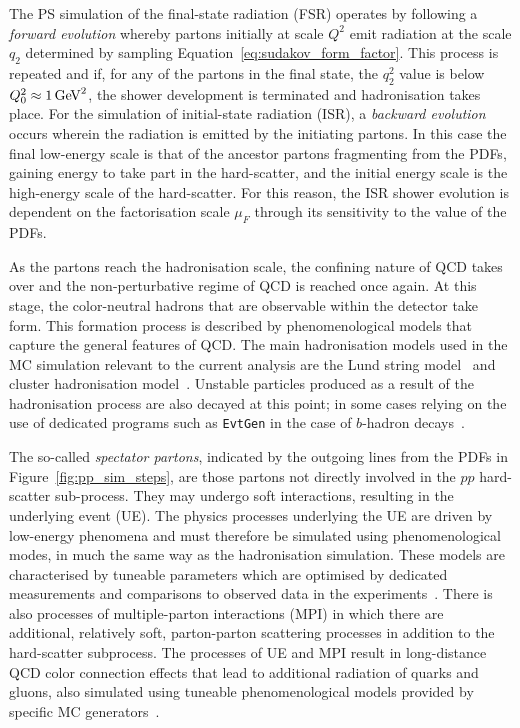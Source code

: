 The PS simulation of the final-state radiation (FSR) operates by following a \textit{forward evolution} whereby partons initially at scale $Q^2$
emit radiation at the scale $q_2$ determined by sampling Equation~\ref{eq:sudakov_form_factor}. This process is repeated and if,
for any of the partons in the final state, the $q_2^2$ value is below $Q_0^2 \approx 1\,\text{Ge\kern -0.1em V}^2$, the shower development is terminated
and hadronisation takes place.
For the simulation of initial-state radiation (ISR), a \textit{backward evolution} occurs wherein the radiation is emitted
by the initiating partons. In this case the final low-energy scale is that of the ancestor partons fragmenting from the PDFs, gaining energy to take part
in the hard-scatter, and the initial energy scale is the high-energy scale of the hard-scatter.
For this reason, the ISR shower evolution is dependent on the factorisation scale $\mu_F$ through
its sensitivity to the value of the PDFs.

As the partons reach the hadronisation scale, the confining nature of QCD takes over and the non-perturbative regime of QCD is reached
once again.
At this stage, the color-neutral hadrons that are observable within the detector take form.
This formation process is described by phenomenological models that capture the general
features of QCD.
The main hadronisation models used in the MC simulation relevant to the current analysis are the
Lund string model~\cite{Andersson:1983ia} and cluster hadronisation model~\cite{Webber:1983if}.
Unstable particles produced as a result of the hadronisation process are also decayed at this point;
in some cases relying on the use of dedicated programs such as \texttt{EvtGen} in the case of $b$-hadron decays~\cite{Lange:2001uf}.

The so-called \textit{spectator partons}, indicated by the outgoing lines from the PDFs in Figure~\ref{fig:pp_sim_steps},
are those partons not directly involved in the $pp$ hard-scatter sub-process.
They may undergo soft interactions, resulting in the underlying event (UE).
The physics processes underlying the UE are driven by low-energy phenomena and must therefore
be simulated using phenomenological modes, in much the same way as the hadronisation simulation.
These models are characterised by tuneable parameters which are optimised by dedicated measurements
and comparisons to observed data in the experiments~\cite{UESim}.
There is also processes of multiple-parton interactions (MPI) in which there are additional,
relatively soft, parton-parton scattering processes in addition to the hard-scatter subprocess.
The processes of UE and MPI result in long-distance QCD color connection effects that lead
to additional radiation of quarks and gluons, also simulated using tuneable phenomenological models
provided by specific MC generators~\cite{Sjostrand:2006za,Butterworth:1996zw}.



